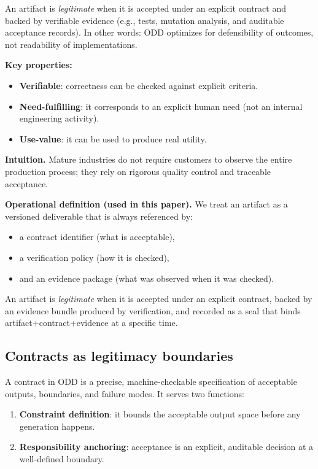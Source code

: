 \documentclass[conference]{IEEEtran}
\begin{document}
An artifact is \emph{legitimate} when it is accepted under an explicit contract and backed by verifiable evidence (e.g., tests, mutation analysis, and auditable acceptance records). In other words: ODD optimizes for defensibility of outcomes, not readability of implementations.

\textbf{Key properties:}
\begin{itemize}
\item \textbf{Verifiable}: correctness can be checked against explicit criteria.
\item \textbf{Need-fulfilling}: it corresponds to an explicit human need (not an internal engineering activity).
\item \textbf{Use-value}: it can be used to produce real utility.
\end{itemize}

\textbf{Intuition.} Mature industries do not require customers to observe the entire production process; they rely on rigorous quality control and traceable acceptance.

\textbf{Operational definition (used in this paper).} We treat an artifact as a versioned deliverable that is always referenced by:
\begin{itemize}
\item a contract identifier (what is acceptable),
\item a verification policy (how it is checked),
\item and an evidence package (what was observed when it was checked).
\end{itemize}

An artifact is \emph{legitimate} when it is accepted under an explicit contract, backed by an evidence bundle produced by verification, and recorded as a seal that binds artifact+contract+evidence at a specific time.

\subsection{Contracts as legitimacy boundaries}
A contract in ODD is a precise, machine-checkable specification of acceptable outputs, boundaries, and failure modes. It serves two functions:
\begin{enumerate}
\item \textbf{Constraint definition}: it bounds the acceptable output space before any generation happens.
\item \textbf{Responsibility anchoring}: acceptance is an explicit, auditable decision at a well-defined boundary.
\end{enumerate}
\end{document}
